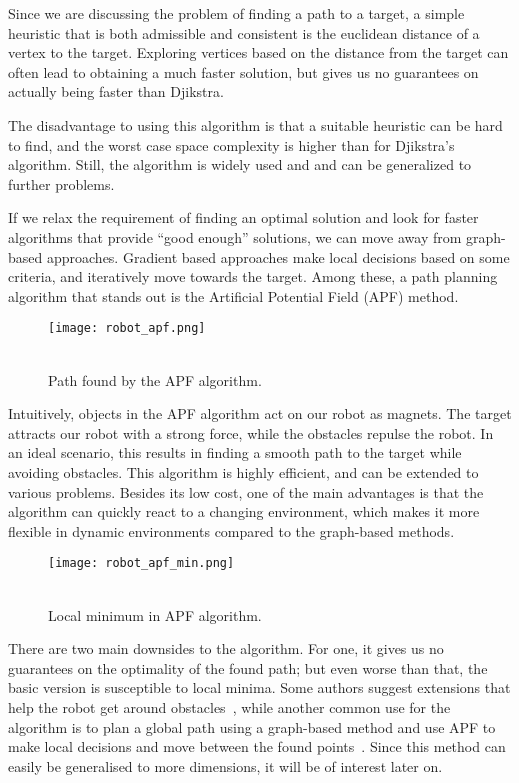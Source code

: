 Since we are discussing the problem of finding a path to a target, a simple heuristic that is both admissible and consistent is the euclidean distance of a vertex to the target. Exploring vertices based on the distance from the target can often lead to obtaining a much faster solution, but gives us no guarantees on actually being faster than Djikstra.

The disadvantage to using this algorithm is that a suitable heuristic can be hard to find, and the worst case space complexity is higher than for Djikstra's algorithm. Still, the algorithm is widely used and and can be generalized to further problems.

If we relax the requirement of finding an optimal solution and look for faster algorithms that provide \enquote{good enough} solutions, we can move away from graph-based approaches. Gradient based approaches make local decisions based on some criteria, and iteratively move towards the target. Among these, a path planning algorithm that stands out is the Artificial Potential Field (APF) method.

\begin{wrapfigure}{r}{0.33\textwidth}
    \centering
    \texttt{[image: robot\_apf.png]}
  \caption{\\Path found by the APF algorithm.}\label{fig:apf}
\end{wrapfigure}

Intuitively, objects in the APF algorithm act on our robot as magnets. The target attracts our robot with a strong force, while the obstacles repulse the robot. In an ideal scenario, this results in finding a smooth path to the target while avoiding obstacles. This algorithm is highly efficient, and can be extended to various problems. Besides its low cost, one of the main advantages is that the algorithm can quickly react to a changing environment, which makes it more flexible in dynamic environments compared to the graph-based methods.

\begin{wrapfigure}{l}{0.33\textwidth}
    \centering
    \texttt{[image: robot\_apf\_min.png]}
  \caption{\\Local minimum in APF algorithm.}\label{fig:apf_min}
\end{wrapfigure}

There are two main downsides to the algorithm. For one, it gives us no guarantees on the optimality of the found path; but even worse than that, the basic version is susceptible to local minima. Some authors suggest extensions that help the robot get around obstacles~\cite{apf, apf2}, while another common use for the algorithm is to plan a global path using a graph-based method and use APF to make local decisions and move between the found points~\cite{hybrid}. Since this method can easily be generalised to more dimensions, it will be of interest later on.

